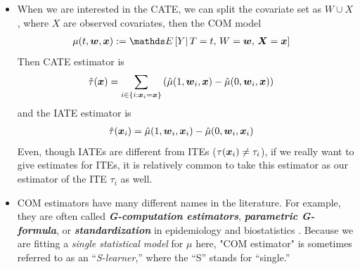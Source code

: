 \documentclass[11pt]{article}
\begin{document}
\begin{itemize}
\item When we are interested in the CATE, we can split the covariate set as $W\cup X$, where $X$ are observed covariates, then the COM model 
\begin{align*}
\mu(t,  \mb{w}, \mb{x}) &:= \E{}{Y |\, T=t,\,W=\mb{w},\, \mb{X}=\mb{x}} 
\end{align*}
Then CATE estimator is
\begin{align}
\hat{\tau}(\boldsymbol{x}) &= \sum_{i \in \left\{i: \boldsymbol{x}_i = \boldsymbol{x}\right\}}\left(\hat{\mu}(1,\boldsymbol{w}_i,  \boldsymbol{x}) - \hat{\mu}(0, \boldsymbol{w}_i,  \boldsymbol{x})\right) \label{eqn: cond_outcome_est_cate}
\end{align} and the IATE estimator is 
\begin{align}
\hat{\tau}(\boldsymbol{x}_i) &=\hat{\mu}(1,\boldsymbol{w}_i,  \boldsymbol{x}_i) - \hat{\mu}(0, \boldsymbol{w}_i,  \boldsymbol{x}_i) \label{eqn: cond_outcome_est_iate}
\end{align} Even, though IATEs are different from ITEs ($\tau(\boldsymbol{x}_i) \neq \tau_i$), if we really want to give estimates for ITEs, it is relatively common to take this estimator
as our estimator of the ITE $\tau_i$ as well.

\item COM estimators have many different names in the literature. For example, they are often called \textbf{\emph{G-computation estimators}}, \emph{\textbf{parametric G-formula}}, or \textit{\textbf{standardization}} in epidemiology and biostatistics \citep{imbens2015causal}. Because we are fitting a \emph{single statistical model} for $\mu$ here, "COM estimator" is sometimes referred to as an “\emph{S-learner},” where the “S” stands for “single.”
\end{itemize}
\end{document}
